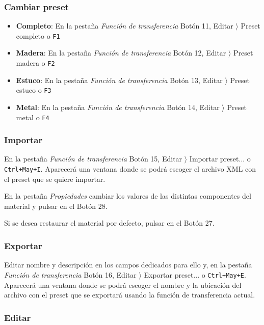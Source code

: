 \subsubsection{Cambiar preset}

\begin{itemize}
	\item \textbf{Completo}: En la pestaña \textit{Función de transferencia} Botón 11, Editar $ \rangle $ Preset completo o \texttt{F1}
	\item \textbf{Madera}: En la pestaña \textit{Función de transferencia} Botón 12, Editar $ \rangle $ Preset madera o \texttt{F2}
	\item \textbf{Estuco}: En la pestaña \textit{Función de transferencia} Botón 13, Editar $ \rangle $ Preset estuco o \texttt{F3}
	\item \textbf{Metal}: En la pestaña \textit{Función de transferencia} Botón 14, Editar $ \rangle $ Preset metal o \texttt{F4}
\end{itemize}

\subsubsection{Importar}

En la pestaña \textit{Función de transferencia} Botón 15, Editar $ \rangle $ Importar preset... o \texttt{Ctrl+May+I}. Aparecerá una ventana donde se podrá escoger el archivo XML con el preset que se quiere importar.

En la pestaña \textit{Propiedades} cambiar los valores de las distintas componentes del material y pulsar en el Botón 28.

Si se desea restaurar el material por defecto, pulsar en el Botón 27.

\subsubsection{Exportar}

Editar nombre y descripción en los campos dedicados para ello y, en la pestaña \textit{Función de transferencia} Botón 16, Editar $ \rangle $ Exportar preset... o \texttt{Ctrl+May+E}. Aparecerá una ventana donde se podrá escoger el nombre y la ubicación del archivo con el preset que se exportará usando la función de transferencia actual.

\subsubsection{Editar}
 
